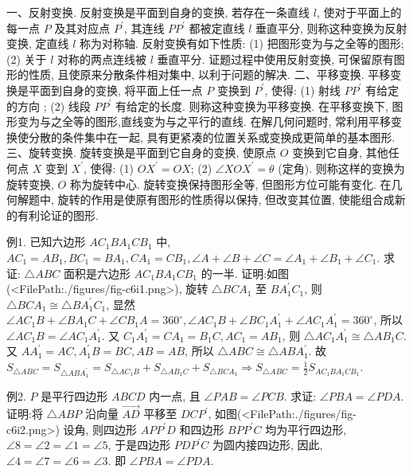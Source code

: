 
一、反射变换.
反射变换是平面到自身的变换, 若存在一条直线 $l$, 使对于平面上的每一点 $P$ 及其对应点 $P^{\prime}$, 其连线 $P P^{\prime}$ 都被定直线 $l$ 垂直平分, 则称这种变换为反射变换, 定直线 $l$ 称为对称轴.
反射变换有如下性质:
(1) 把图形变为与之全等的图形;
(2) 关于 $l$ 对称的两点连线被 $l$ 垂直平分.
证题过程中使用反射变换, 可保留原有图形的性质, 且使原来分散条件相对集中, 以利于问题的解决.
二、平移变换.
平移变换是平面到自身的变换, 将平面上任一点 $P$ 变换到 $P^{\prime}$, 使得: (1) 射线 $P P^{\prime}$ 有给定的方向 ; (2) 线段 $P P^{\prime}$ 有给定的长度.
则称这种变换为平移变换.
在平移变换下, 图形变为与之全等的图形,直线变为与之平行的直线.
在解几何问题时, 常利用平移变换使分散的条件集中在一起, 具有更紧凑的位置关系或变换成更简单的基本图形.
三、旋转变换.
旋转变换是平面到它自身的变换, 使原点 $O$ 变换到它自身, 其他任何点 $X$ 变到 $X^{\prime}$, 使得: (1) $O X^{\prime}=O X$; (2) $\angle X O X^{\prime}=\theta$ (定角). 则称这样的变换为旋转变换, $O$ 称为旋转中心.
旋转变换保持图形全等, 但图形方位可能有变化.
在几何解题中, 旋转的作用是使原有图形的性质得以保持, 但改变其位置, 使能组合成新的有利论证的图形.



例1. 已知六边形 $A C_1 B A_1 C B_1$ 中, $A C_1=A B_1, B C_1=B A_1, C A_1= C B_1, \angle A+\angle B+\angle C=\angle A_1+\angle B_1+\angle C_1$.
求证: $\triangle A B C$ 面积是六边形 $A C_1 B A_1 C B_1$ 的一半.
证明:如图(<FilePath:./figures/fig-c6i1.png>), 旋转 $\triangle B C A_1$ 至 $B A_1^{\prime} C_1$, 则 $\triangle B C A_1 \cong \triangle B A_1^{\prime} C_1$, 显然 $\angle A C_1 B+\angle B A_1 C+ \angle C B_1 A=360^{\circ}, \angle A C_1 B+\angle B C_1 A_1^{\prime}+\angle A C_1 A_1^{\prime}= 360^{\circ}$, 所以 $\angle A C_1 B=\angle A C_1 A_1^{\prime}$.
又 $C_1 A_1^{\prime}=C A_1=B_1 C, A C_1=A B_1$, 则 $\triangle A C_1 A_1^{\prime} \cong \triangle A B_1 C$.
又 $A A_1^{\prime}=A C, A_1^{\prime} B=B C, A B=A B$, 所以 $\triangle A B C \cong \triangle A B A_1^{\prime}$.
故 $S_{\triangle A B C}=S_{\triangle A B A_1^{\prime}}=S_{\triangle A C_1 B}+S_{\triangle A B_1 C}+S_{\triangle B C A_1} \Rightarrow S_{\triangle A B C}=\frac{1}{2} S_{A C_1 B A_1 C B_1}$.



例2. $P$ 是平行四边形 $A B C D$ 内一点, 且 $\angle P A B=\angle P C B$. 求证: $\angle P B A=\angle P D A$.
证明:将 $\triangle A B P$ 沿向量 $\overrightarrow{A D}$ 平移至 $D C P^{\prime}$, 如图(<FilePath:./figures/fig-c6i2.png>) 设角, 则四边形 $A P P^{\prime} D$ 和四边形 $B P P^{\prime} C$ 均为平行四边形, $\angle 8=\angle 2=\angle 1= \angle 5$, 于是四边形 $P D P^{\prime} C$ 为圆内接四边形, 因此, $\angle 4=\angle 7=\angle 6=\angle 3$.
即 $\angle P B A=\angle P D A$.



